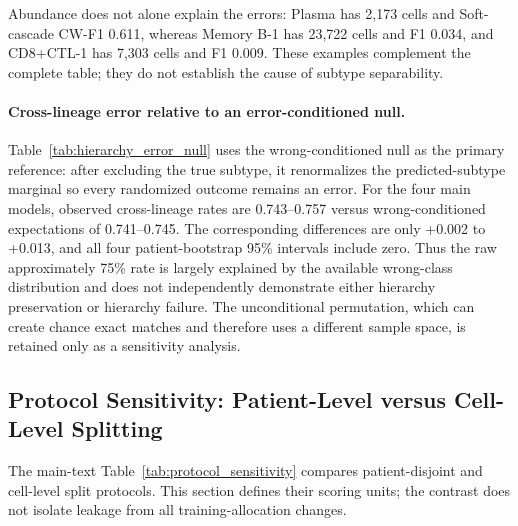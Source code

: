 \documentclass{article} %
\begin{document}


Abundance does not alone explain the errors: Plasma has 2,173 cells and
Soft-cascade CW-F1 0.611, whereas Memory B-1 has 23,722 cells and F1 0.034,
and CD8+CTL-1 has 7,303 cells and F1 0.009. These examples complement the
complete table; they do not establish the cause of subtype separability.

\paragraph{Cross-lineage error relative to an error-conditioned null.}
Table~\ref{tab:hierarchy_error_null} uses the wrong-conditioned null as the
primary reference: after excluding the true subtype, it renormalizes the
predicted-subtype marginal so every randomized outcome remains an error. For the
four main models, observed cross-lineage rates are 0.743--0.757 versus
wrong-conditioned expectations of 0.741--0.745. The corresponding differences
are only +0.002 to +0.013, and all four patient-bootstrap 95\% intervals include
zero. Thus the raw approximately 75\% rate is largely explained by the available
wrong-class distribution and does not independently demonstrate either
hierarchy preservation or hierarchy failure. The unconditional permutation,
which can create chance exact matches and therefore uses a different sample
space, is retained only as a sensitivity analysis.



\subsection{Protocol Sensitivity: Patient-Level versus Cell-Level Splitting}
\label{sec:appendix:protocol_sensitivity}

The main-text Table~\ref{tab:protocol_sensitivity} compares patient-disjoint
and cell-level split protocols. This section defines their scoring units;
the contrast does not isolate leakage from all training-allocation changes.
\end{document}
